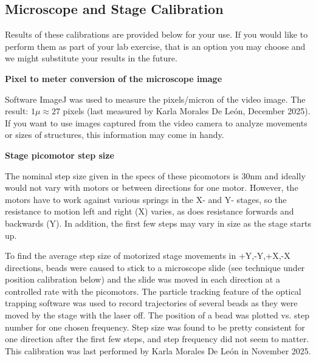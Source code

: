 \documentclass{../lab}
\begin{document}
\subsection{Microscope and Stage Calibration}

Results of these calibrations are provided below for your use. If you would like to perform them as part of your lab exercise, that is an option you may choose and we might substitute your results in the future.

\textbf{Pixel to meter conversion of the microscope image}

Software ImageJ was used to measure the pixels/micron of the video image. The result: $1\mu \approx 27$ pixels (last measured by Karla Morales De Le\'on, December 2025). If you want to use images captured from the video camera to analyze movements or sizes of structures, this information may come in handy.



\textbf{Stage picomotor step size}

The nominal step size given in the specs of these picomotors is 30nm and ideally would not vary with motors or between directions for one motor. However, the motors have to work against various springs in the X- and Y- stages, so the resistance to motion left and right (X) varies, as does resistance forwards and backwards (Y). In addition, the first few steps may vary in size as the stage starts up.

To find the average step size of motorized stage movements in +Y,-Y,+X,-X directions, beads were caused to stick to a microscope slide (see technique under position calibration below) and the slide was moved in each direction at a controlled rate with the picomotors. The particle tracking feature of the optical trapping software was used to record trajectories of several beads as they were moved by the stage with the laser off. The position of a bead was plotted vs. step number for one chosen frequency. Step size was found to be pretty consistent for one direction after the first few steps, and step frequency did not seem to matter. This calibration was last performed by Karla Morales De Le\'on in November 2025.
\end{document}
